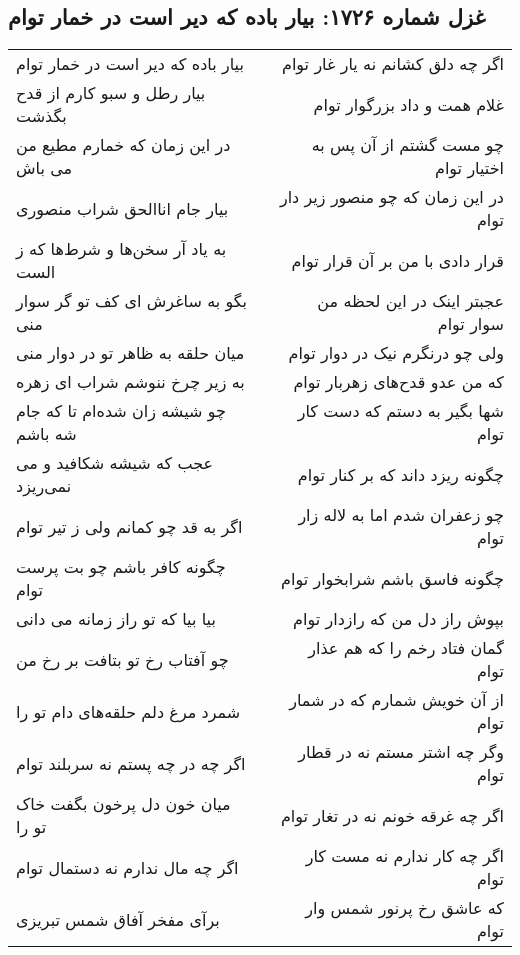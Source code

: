 \begin{center}
\section*{غزل شماره ۱۷۲۶: بیار باده که دیر است در خمار توام}
\label{sec:1726}
\begin{longtable}{l p{0.5cm} r}
بیار باده که دیر است در خمار توام
&&
اگر چه دلق کشانم نه یار غار توام
\\
بیار رطل و سبو کارم از قدح بگذشت
&&
غلام همت و داد بزرگوار توام
\\
در این زمان که خمارم مطیع من می باش
&&
چو مست گشتم از آن پس به اختیار توام
\\
بیار جام اناالحق شراب منصوری
&&
در این زمان که چو منصور زیر دار توام
\\
به یاد آر سخن‌ها و شرط‌ها که ز الست
&&
قرار دادی با من بر آن قرار توام
\\
بگو به ساغرش ای کف تو گر سوار منی
&&
عجبتر اینک در این لحظه من سوار توام
\\
میان حلقه به ظاهر تو در دوار منی
&&
ولی چو درنگرم نیک در دوار توام
\\
به زیر چرخ ننوشم شراب ای زهره
&&
که من عدو قدح‌های زهربار توام
\\
چو شیشه زان شده‌ام تا که جام شه باشم
&&
شها بگیر به دستم که دست کار توام
\\
عجب که شیشه شکافید و می نمی‌ریزد
&&
چگونه ریزد داند که بر کنار توام
\\
اگر به قد چو کمانم ولی ز تیر توام
&&
چو زعفران شدم اما به لاله زار توام
\\
چگونه کافر باشم چو بت پرست توام
&&
چگونه فاسق باشم شرابخوار توام
\\
بیا بیا که تو راز زمانه می دانی
&&
بپوش راز دل من که رازدار توام
\\
چو آفتاب رخ تو بتافت بر رخ من
&&
گمان فتاد رخم را که هم عذار توام
\\
شمرد مرغ دلم حلقه‌های دام تو را
&&
از آن خویش شمارم که در شمار توام
\\
اگر چه در چه پستم نه سربلند توام
&&
وگر چه اشتر مستم نه در قطار توام
\\
میان خون دل پرخون بگفت خاک تو را
&&
اگر چه غرقه خونم نه در تغار توام
\\
اگر چه مال ندارم نه دستمال توام
&&
اگر چه کار ندارم نه مست کار توام
\\
برآی مفخر آفاق شمس تبریزی
&&
که عاشق رخ پرنور شمس وار توام
\\
\end{longtable}
\end{center}
